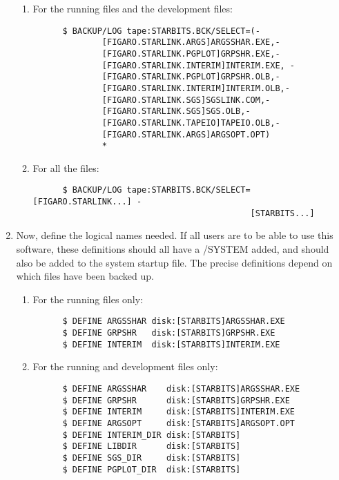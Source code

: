 \begin{enumerate}
\begin{enumerate}
\item For the running files and the development files:

\begin{verbatim}
      $ BACKUP/LOG tape:STARBITS.BCK/SELECT=(-
              [FIGARO.STARLINK.ARGS]ARGSSHAR.EXE,-
              [FIGARO.STARLINK.PGPLOT]GRPSHR.EXE,-
              [FIGARO.STARLINK.INTERIM]INTERIM.EXE, -
              [FIGARO.STARLINK.PGPLOT]GRPSHR.OLB,-
              [FIGARO.STARLINK.INTERIM]INTERIM.OLB,-
              [FIGARO.STARLINK.SGS]SGSLINK.COM,-
              [FIGARO.STARLINK.SGS]SGS.OLB,-
              [FIGARO.STARLINK.TAPEIO]TAPEIO.OLB,-
              [FIGARO.STARLINK.ARGS]ARGSOPT.OPT) 
              *
\end{verbatim}

\item For all the files:

\begin{verbatim}
      $ BACKUP/LOG tape:STARBITS.BCK/SELECT=[FIGARO.STARLINK...] -
                                            [STARBITS...]
\end{verbatim}

\end{enumerate}

\item Now, define the logical names needed. If all users are to be able to use
this software, these definitions should all have a /SYSTEM added, and should
also be added to the system startup file. The precise definitions depend on
which files have been backed up.

\begin{enumerate}

\item For the running files only:

\begin{verbatim}
      $ DEFINE ARGSSHAR disk:[STARBITS]ARGSSHAR.EXE
      $ DEFINE GRPSHR   disk:[STARBITS]GRPSHR.EXE
      $ DEFINE INTERIM  disk:[STARBITS]INTERIM.EXE
\end{verbatim}      

\item For the running and development files only:

\begin{verbatim}
      $ DEFINE ARGSSHAR    disk:[STARBITS]ARGSSHAR.EXE
      $ DEFINE GRPSHR      disk:[STARBITS]GRPSHR.EXE
      $ DEFINE INTERIM     disk:[STARBITS]INTERIM.EXE
      $ DEFINE ARGSOPT     disk:[STARBITS]ARGSOPT.OPT
      $ DEFINE INTERIM_DIR disk:[STARBITS]
      $ DEFINE LIBDIR      disk:[STARBITS]
      $ DEFINE SGS_DIR     disk:[STARBITS]
      $ DEFINE PGPLOT_DIR  disk:[STARBITS]
\end{verbatim}


\end{enumerate}
\end{enumerate}
